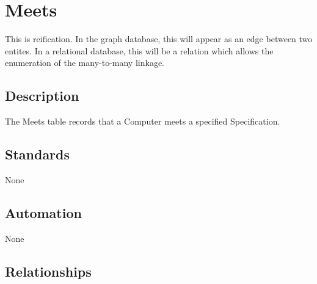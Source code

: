 \section{Meets}\label{meets}

This is reification. In the graph database, this will appear as an edge
between two entites. In a relational database, this will be a relation
which allows the enumeration of the many-to-many linkage.

\subsection{Description}\label{description-17}

The Meets table records that a Computer meets a specified Specification.

\subsection{Standards}\label{standards-19}

None

\subsection{Automation}\label{automation-19}

None

\subsection{Relationships}\label{relationships-15}


